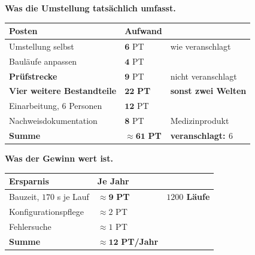 \begin{merksatz}
\textbf{Was die Umstellung tatsächlich umfasst.}

\begin{center}
{\small
\renewcommand{\arraystretch}{1.45}
\begin{tabular}{@{}P{3.0cm}P{2.0cm}P{2.6cm}@{}}
\toprule
\textbf{Posten} & \textbf{Aufwand} & \\
\midrule
Umstellung selbst & $\mathbf{6}$ PT & \textcolor{gruen}{wie veranschlagt}\\
Bauläufe anpassen & $\mathbf{4}$ PT & \\
\textbf{Prüfstrecke} & $\mathbf{9}$ PT & \textcolor{akzent}{nicht veranschlagt}\\
\textbf{Vier weitere Bestandteile} & \textcolor{akzent}{$\mathbf{22}$ \textbf{PT}} & \textcolor{akzent}{\textbf{sonst zwei Welten}}\\
Einarbeitung, $6$ Personen & $\mathbf{12}$ PT & \\
Nachweis\-dokumentation & \textcolor{akzent}{$\mathbf{8}$ PT} & \textcolor{akzent}{Medizinprodukt}\\
\midrule
\textbf{Summe} & \textcolor{akzent}{$\approx\mathbf{61}$ \textbf{PT}} & \textbf{veranschlagt: $6$}\\
\bottomrule
\end{tabular}}
\end{center}

\begin{center}
\begin{minipage}{0.88\textwidth}
\end{minipage}
\end{center}

\textbf{Was der Gewinn wert ist.}

\begin{center}
\renewcommand{\arraystretch}{1.45}
\begin{tabular}{@{}P{3.0cm}P{2.2cm}P{2.6cm}@{}}
\toprule
\textbf{Ersparnis} & \textbf{Je Jahr} & \\
\midrule
Bauzeit, $170$ s je Lauf & $\approx\mathbf{9}$ \textbf{PT} & \textbf{$1200$ Läufe}\\
Konfigurations\-pflege & $\approx2$ PT & \\
Fehlersuche & $\approx1$ PT & \\
\midrule
\textbf{Summe} & $\approx\mathbf{12}$ \textbf{PT/Jahr} & \\
\bottomrule
\end{tabular}
\end{center}

\begin{center}
\end{center}
\end{merksatz}

